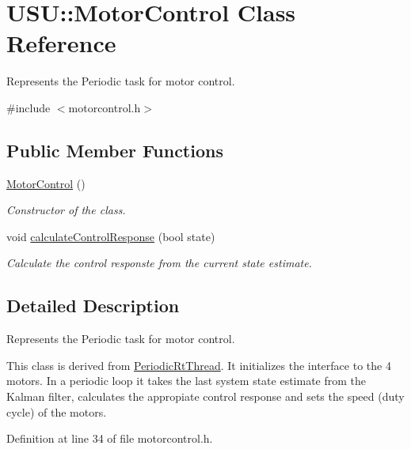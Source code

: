 \hypertarget{class_u_s_u_1_1_motor_control}{\section{\-U\-S\-U\-:\-:\-Motor\-Control \-Class \-Reference}
\label{class_u_s_u_1_1_motor_control}
}


\-Represents the \-Periodic task for motor control.  




{\ttfamily \#include $<$motorcontrol.\-h$>$}

\subsection*{\-Public \-Member \-Functions}
\begin{DoxyCompactItemize}
\item 
\hyperlink{class_u_s_u_1_1_motor_control_a56ef29cfa725b1ceebd63722f67cc94f}{\-Motor\-Control} ()
\begin{DoxyCompactList}\small\item\em \-Constructor of the class. \end{DoxyCompactList}\item 
void \hyperlink{class_u_s_u_1_1_motor_control_ac37d32e9cc1bd392873f155758267564}{calculate\-Control\-Response} (bool state)
\begin{DoxyCompactList}\small\item\em \-Calculate the control responste from the current state estimate. \end{DoxyCompactList}\end{DoxyCompactItemize}


\subsection{\-Detailed \-Description}
\-Represents the \-Periodic task for motor control. 

\-This class is derived from \hyperlink{class_u_s_u_1_1_periodic_rt_thread}{\-Periodic\-Rt\-Thread}. \-It initializes the interface to the 4 motors. \-In a periodic loop it takes the last system state estimate from the \-Kalman filter, calculates the appropiate control response and sets the speed (duty cycle) of the motors. 

\-Definition at line 34 of file motorcontrol.\-h.



